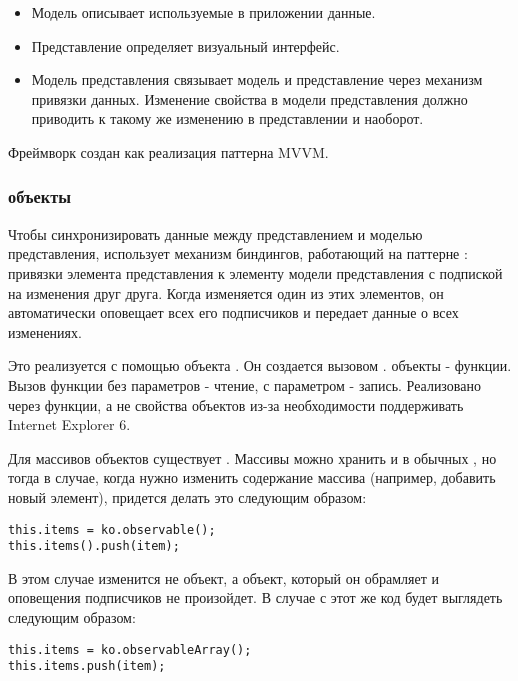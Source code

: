 \documentclass[a4paper,14pt]{extarticle}
\begin{document}
\begin{itemize}
    \item Модель описывает используемые в приложении данные.
    \item Представление определяет визуальный интерфейс.
    \item Модель представления связывает модель и представление через механизм
          привязки данных. Изменение свойства в модели представления должно
          приводить к такому же изменению в представлении и наоборот.
\end{itemize}

Фреймворк  создан как реализация паттерна MVVM.

\subsubsection{ объекты}

Чтобы синхронизировать данные между представлением и моделью представления,
 использует механизм биндингов, работающий на паттерне
: привязки элемента представления к элементу модели
представления с подпиской на изменения друг друга. Когда изменяется один из этих
элементов, он автоматически оповещает всех его подписчиков и передает данные о
всех изменениях.

Это реализуется с помощью объекта . Он создается вызовом
.  объекты - функции. Вызов функции без
параметров - чтение, с параметром - запись. Реализовано через функции, а не
свойства объектов из-за необходимости поддерживать Internet Explorer 6.

Для массивов объектов существует . Массивы можно хранить и в
обычных , но тогда в случае, когда нужно изменить содержание массива
(например, добавить новый элемент), придется делать это следующим образом:

\begin{lstlisting}
this.items = ko.observable();
this.items().push(item);
\end{lstlisting}

В этом случае изменится не  объект, а объект, который он обрамляет и
оповещения подписчиков не произойдет. В случае с  этот же код
будет выглядеть следующим образом: 

\begin{lstlisting}
this.items = ko.observableArray();
this.items.push(item);
\end{lstlisting}
\end{document}
